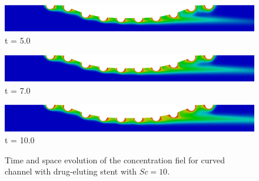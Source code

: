 \begin{figure}[H]
     \begin{minipage}{.50\linewidth}
      \centering
      \includegraphics[scale=0.12]{./02_chaps/cap_solution/figure/conc10_CurvedStrut25000.png}\\
      t = 5.0
     \end{minipage}
     \begin{minipage}{.50\linewidth}
     \medskip
      \centering
      \includegraphics[scale=0.12]{./02_chaps/cap_solution/figure/conc10_CurvedStrut35000.png}\\
      t = 7.0
     \end{minipage}%
     \begin{minipage}{.50\linewidth}
     \medskip
      \centering
      \includegraphics[scale=0.12]{./02_chaps/cap_solution/figure/conc10_CurvedStrut50000.png}\\
      t = 10.0
     \end{minipage}
     \medskip
     \caption{
Time and space evolution of the concentration fiel for curved channel with drug-eluting stent with $Sc=10$.}
     \label{conc field curved stent sc 10}
\end{figure}

\medskip
